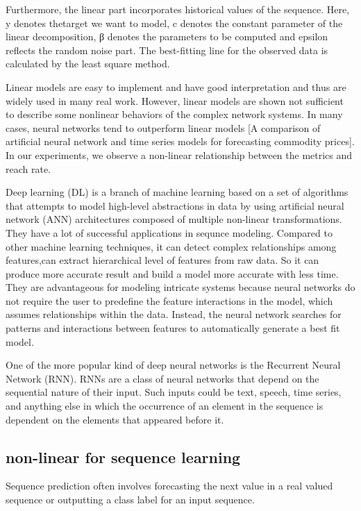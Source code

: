 \documentclass[5p]{elsarticle}
\newcommand{\dabiaolv}{reach rate}
\begin{document}
Furthermore, the linear part incorporates historical values of the sequence. Here, y denotes thetarget we want to model, c denotes the constant parameter of the linear decomposition, β denotes the parameters to be computed and epsilon reflects the random noise part. The best-fitting line for the observed data is calculated by the least square method.


Linear models are easy to implement and have good interpretation and thus are widely used in many real work. However, linear models are shown not sufficient to describe some nonlinear behaviors of the complex network systems. In many cases, neural networks tend to outperform linear models [A comparison of artificial neural network and time series models for forecasting commodity prices]. In our experiments, we observe a non-linear relationship between the metrics and \dabiaolv.

Deep learning (DL) is a branch of machine learning based on a set of algorithms that attempts to model high-level abstractions in data by using artificial neural network (ANN) architectures composed of multiple non-linear transformations. They have a lot of successful applications in sequnce modeling. Compared to other machine learning techniques, it can detect complex relationships among features,can extract hierarchical level of features from raw data. So it can produce more accurate result and build a model more accurate with less time. They are advantageous for modeling intricate systems because neural networks do not require the user to predefine the feature interactions in the model, which assumes relationships within the data. Instead, the neural network searches for patterns and interactions between features to automatically generate a best fit model.

One of the more popular kind of deep neural networks is the Recurrent Neural Network (RNN). RNNs are a class of neural networks that depend on the sequential nature of their input. Such inputs could be text, speech, time series, and anything else in which the occurrence of an element in the sequence is dependent on the elements that appeared before it.

\subsection{non-linear for sequence learning}
Sequence prediction often involves forecasting the next value in a real valued sequence or outputting a class label for an input sequence.
\end{document}
